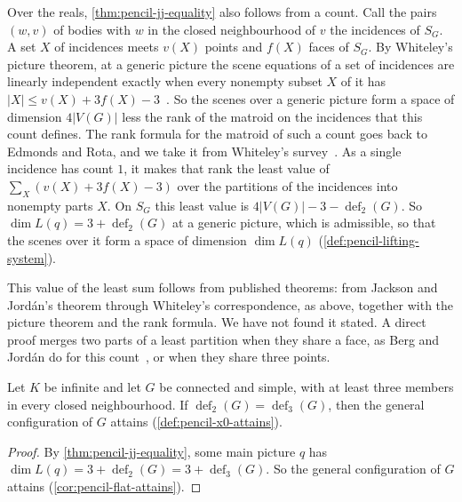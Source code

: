 \begin{remark}
  \label{rem:pencil-jj-count}
  Over the reals, \cref{thm:pencil-jj-equality} also follows from a
  count. Call the pairs
  $(w, v)$ of bodies with $w$ in the closed neighbourhood of $v$ the
  incidences of $S_G$. A set $X$ of incidences meets $v(X)$ points and
  $f(X)$ faces of $S_G$. By Whiteley's picture theorem, at a generic
  picture the scene equations of a set of incidences are linearly
  independent exactly when every nonempty subset $X$ of it has
  $|X| \le v(X) + 3f(X) - 3$~\cite[Theorem~3.1]{whiteley1989}. So the
  scenes over a generic picture form a space of dimension $4|V(G)|$ less
  the rank of the matroid on the incidences that this count defines. The
  rank formula for the matroid of such a count goes back to Edmonds and
  Rota, and we take it from Whiteley's
  survey~\cite[Theorem~A.1.4]{whiteley1996}. As a single incidence has
  count $1$, it makes that rank the least value of
  $\sum_X (v(X) + 3f(X) - 3)$ over the partitions of the incidences into
  nonempty parts $X$. On $S_G$ this least value is
  $4|V(G)| - 3 - \operatorname{def}_2(G)$. So
  $\dim L(q) = 3 + \operatorname{def}_2(G)$ at a generic picture, which
  is admissible, so that the scenes over it form a space of dimension
  $\dim L(q)$ (\cref{def:pencil-lifting-system}).

  This value of the least sum follows from published theorems: from
  Jackson and Jord\'an's theorem through Whiteley's correspondence, as
  above, together with the picture theorem and the rank formula. We have
  not found it stated. A direct proof merges two parts of a least
  partition when they share a face, as Berg and Jord\'an do for this
  count~\cite[proof of Theorem~4]{bergJordan2003}, or when they share
  three points.
\end{remark}

\begin{corollary}
  \label{cor:pencil-jj-flat}
  \leanok
  Let $K$ be infinite and let $G$ be connected and simple, with at least
  three members in every closed neighbourhood. If
  $\operatorname{def}_2(G) = \operatorname{def}_3(G)$, then the general
  configuration of $G$ attains (\cref{def:pencil-x0-attains}).
\end{corollary}
\begin{proof}
  \leanok
  By \cref{thm:pencil-jj-equality}, some main picture $q$ has
  $\dim L(q) = 3 + \operatorname{def}_2(G) = 3 + \operatorname{def}_3(G)$.
  So the general configuration of $G$ attains
  (\cref{cor:pencil-flat-attains}).
\end{proof}

